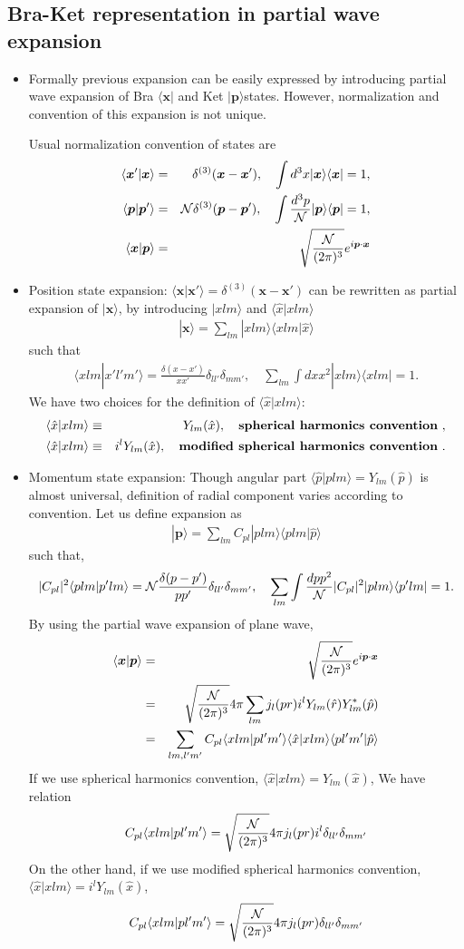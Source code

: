 \documentclass[10pt]{book}
\def\bm{\boldsymbol}
\newcommand{\bea}{\begin{eqnarray}}
\newcommand{\eea}{\end{eqnarray}}
\newcommand{\no}{\nonumber \\}
\def\vp{{\bm p}}
\def\vx{{\bm x}}
\def\la{\langle}
\def\ra{\rangle}
\begin{document}
\subsection{Bra-Ket representation in partial wave expansion}
\begin{itemize}
\item Formally previous expansion can be easily expressed by introducing 
      partial wave expansion of Bra $\la \vx|$ and Ket $|\vp\ra $states.
      However, normalization and convention of this expansion is not unique.
      
      Usual normalization convention of states are
      \bea 
      \la \vx'|\vx\ra &=&\delta^{(3)}(\vx-\vx'),\quad 
      \int d^3x |\vx\ra \la \vx| =1,\no 
      \la \vp|\vp'\ra &=&{\cal N} \delta^{(3)}(\vp-\vp'),\quad 
      \int \frac{d^3p}{{\cal N}}|\vp\ra \la \vp| =1,\no 
      \la \vx|\vp\ra &=& \sqrt{\frac{{\cal N}}{(2\pi)^3}} e^{i\vp\cdot\vx}
      \eea 
\item Position state expansion: $\la \vx|\vx'\ra=\delta^{(3)}(\vx-\vx')$ can be rewritten as
partial expansion of $|\vx\ra$, by introducing $|xlm\ra$ and $\la \hat{x}|xlm\ra $
\bea
\boxed{ 
|\vx\ra=\sum_{lm}|x lm\ra\la x lm|\hat{x}\ra}
\eea
such that 
\bea
\la x lm|x' l' m'\ra=\frac{\delta(x-x')}{xx'}\delta_{ll'}\delta_{mm'},
\quad
\sum_{lm}\int dx x^2 |x lm\ra\la x lm|=1.
\eea
We have two choices for the definition of $\la \hat{x}|xlm\ra $:
\bea 
\la\hat{x}| x lm\ra&\equiv& Y_{lm}(\hat{x}),\quad 
   \mbox{{\bf spherical harmonics convention} },\no 
\la\hat{x}| x lm\ra&\equiv& i^l Y_{lm}(\hat{x}),\quad
  \mbox{{\bf modified spherical harmonics convention} }.
\eea 

\item Momentum state expansion: Though
 angular part $\la \hat{p}|p lm\ra=Y_{lm}(\hat{p})$ is almost universal,
 definition of radial component varies according to convention. 
 Let us define expansion as 
 \bea 
 \boxed{ 
 |\vp\ra =\sum_{lm} C_{pl} |plm\ra \la plm|\hat{p}\ra  }
 \eea 
 such that,
 \bea 
  |C_{pl}|^2 \la plm|p' lm\ra ={\cal N}\frac{\delta(p-p')}{pp'}\delta_{ll'}\delta_{mm'},\quad 
  \sum_{lm} \int \frac{dp p^2}{{\cal N}}|C_{pl}|^2 |p lm\ra \la p' lm|=1.
 \eea 
 By using the partial wave expansion of plane wave,
 \bea 
 \la \vx|\vp\ra &=&\sqrt{\frac{\cal N}{(2\pi)^{3}}} e^{i\vp\cdot\vx } \no 
                &=&\sqrt{\frac{\cal N}{(2\pi)^{3}}} 4\pi \sum_{lm} j_l(pr) i^l Y_{lm}(\hat{r})Y^*_{lm}(\hat{p}) \no 
                &=&\sum_{lm,l'm'} C_{pl} \la xlm|p l'm'\ra \la \hat{x}|xlm\ra \la pl'm'| \hat{p}\ra 
 \eea 
 If we use spherical harmonics convention, $\la \hat{x}|xlm\ra=Y_{lm}(\hat{x})$,
 We have relation 
 \bea 
 C_{pl} \la xlm|p l'm'\ra=\sqrt{\frac{\cal N}{(2\pi)^{3}}} 4\pi j_{l}(pr) i^l \delta_{ll'}\delta_{mm'}
 \eea 
 On the other hand, if we use modified spherical harmonics convention, 
 $\la \hat{x}|xlm\ra=i^l Y_{lm}(\hat{x})$, 
 \bea 
  C_{pl} \la xlm|p l'm'\ra=\sqrt{\frac{\cal N}{(2\pi)^{3}}} 4\pi j_{l}(pr)\delta_{ll'}\delta_{mm'}
 \eea 
 

\end{itemize}
\end{document}
